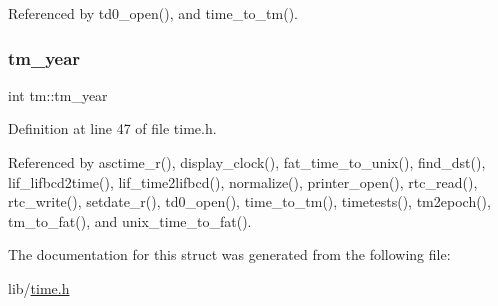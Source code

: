 Referenced by td0\+\_\+open(), and time\+\_\+to\+\_\+tm().

\mbox{\label{structtm_a33adf78fd6476b2120ce3b9c4a852053}} 
\subsubsection{\texorpdfstring{tm\+\_\+year}{tm\_year}}
{\footnotesize\ttfamily int tm\+::tm\+\_\+year}



Definition at line 47 of file time.\+h.



Referenced by asctime\+\_\+r(), display\+\_\+clock(), fat\+\_\+time\+\_\+to\+\_\+unix(), find\+\_\+dst(), lif\+\_\+lifbcd2time(), lif\+\_\+time2lifbcd(), normalize(), printer\+\_\+open(), rtc\+\_\+read(), rtc\+\_\+write(), setdate\+\_\+r(), td0\+\_\+open(), time\+\_\+to\+\_\+tm(), timetests(), tm2epoch(), tm\+\_\+to\+\_\+fat(), and unix\+\_\+time\+\_\+to\+\_\+fat().



The documentation for this struct was generated from the following file\+:\begin{DoxyCompactItemize}
\item 
lib/\hyperlink{time_8h}{time.\+h}\end{DoxyCompactItemize}
